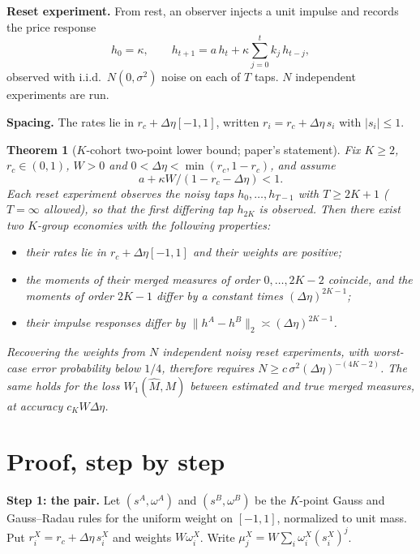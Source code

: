 \documentclass[11pt]{article}
\newtheorem*{theorem*}{Theorem}
\begin{document}
\textbf{Reset experiment.} From rest, an observer injects a unit impulse and records the price response
\[
h_0=\kappa,\qquad h_{t+1}=a\,h_t+\kappa\sum_{j=0}^{t}k_j\,h_{t-j},
\]
observed with i.i.d.\ $N(0,\sigma^2)$ noise on each of $T$ taps. $N$ independent experiments are run.

\textbf{Spacing.} The rates lie in $r_c+\Delta\eta[-1,1]$, written $r_i=r_c+\Delta\eta\,s_i$ with $|s_i|\le1$.

\begin{theorem*}[\label{thm}$K$-cohort two-point lower bound; paper's statement]
Fix $K\ge2$, $r_c\in(0,1)$, $W>0$ and $0<\Delta\eta<\min(r_c,1-r_c)$, and assume
\[
a+\kappa W/(1-r_c-\Delta\eta)<1 .
\]
Each reset experiment observes the noisy taps $h_0,\ldots,h_{T-1}$ with $T\ge2K+1$ ($T=\infty$ allowed), so that the first differing tap $h_{2K}$ is observed. Then there exist two $K$-group economies with the following properties:
\begin{itemize}
\item their rates lie in $r_c+\Delta\eta[-1,1]$ and their weights are positive;
\item the moments of their merged measures of order $0,\dots,2K-2$ coincide, and the moments of order $2K-1$ differ by a constant times $(\Delta\eta)^{2K-1}$;
\item their impulse responses differ by $\|h^A-h^B\|_2\asymp(\Delta\eta)^{2K-1}$.
\end{itemize}
Recovering the weights from $N$ independent noisy reset experiments, with worst-case error probability below $1/4$, therefore requires $N\ge c\,\sigma^2(\Delta\eta)^{-(4K-2)}$. The same holds for the loss $W_1(\hat M,M)$ between estimated and true merged measures, at accuracy $c_KW\Delta\eta$.
\end{theorem*}

\section{Proof, step by step}\label{sec:proof}

\textbf{Step 1: the pair.} Let $(s^A,\omega^A)$ and $(s^B,\omega^B)$ be the $K$-point Gauss and Gauss--Radau rules for the uniform weight on $[-1,1]$, normalized to unit mass. Put $r^X_i=r_c+\Delta\eta\,s^X_i$ and weights $W\omega^X_i$. Write $\mu^X_j=W\sum_i\omega^X_i(s^X_i)^j$.
\end{document}
